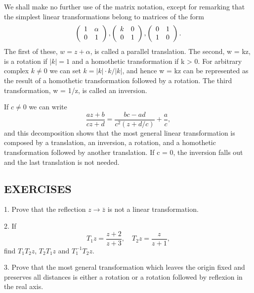 We shall make no further use of the matrix notation, except for remarking that the simplest linear transformations belong to matrices of the form
\begin{equation*}
\left( \begin{array}{c c} 1 & \alpha \\ 0 & 1 \end{array} \right), \left( \begin{array}{c c} k & 0 \\ 0 & 1 \end{array} \right), \left( \begin{array}{c c} 0 & 1 \\ 1 & 0 \end{array} \right).
\end{equation*}
The first of these, $w = z + \alpha$, is called a parallel translation. The second, w = kz, is a rotation if $|k| = 1$ and a homothetic transformation if k > 0. For arbitrary complex $k \neq 0$ we can set $k = |k| \cdot k / |k|$, and hence w = kz can be represented as the result of a homothetic transformation followed by a rotation. The third transformation, w = 1/z, is called an inversion.

If $c \neq 0$ we can write
\begin{equation*}
\frac {a z + b}{c z + d} = \frac {b c - a d}{c ^ {2} (z + d / c)} + \frac {a}{c},
\end{equation*}
and this decomposition shows that the most general linear transformation is composed by a translation, an inversion, a rotation, and a homothetic transformation followed by another translation. If c = 0, the inversion falls out and the last translation is not needed.

\subsection*{EXERCISES}
1. Prove that the reflection $z \rightarrow \bar{z}$ is not a linear transformation.

2. If
\begin{equation*}
T _ {1} z = \frac {z + 2}{z + 3}, \quad T _ {2} z = \frac {z}{z + 1},
\end{equation*}
find $T_{1}T_{2}z$, $T_{2}T_{1}z$ and $T_{1}^{-1}T_{2}z$.

3. Prove that the most general transformation which leaves the origin fixed and preserves all distances is either a rotation or a rotation followed by reflexion in the real axis.

